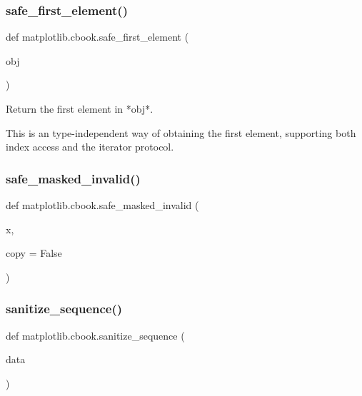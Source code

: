 \subsubsection{\texorpdfstring{safe\+\_\+first\+\_\+element()}{safe\_first\_element()}}
{\footnotesize\ttfamily def matplotlib.\+cbook.\+safe\+\_\+first\+\_\+element (\begin{DoxyParamCaption}\item[{}]{obj }\end{DoxyParamCaption})}

\begin{DoxyVerb}Return the first element in *obj*.

This is an type-independent way of obtaining the first element, supporting
both index access and the iterator protocol.
\end{DoxyVerb}
 \mbox{\label{namespacematplotlib_1_1cbook_a1b513669a33f2fff0c61d719ea76f0a1}} 
\subsubsection{\texorpdfstring{safe\+\_\+masked\+\_\+invalid()}{safe\_masked\_invalid()}}
{\footnotesize\ttfamily def matplotlib.\+cbook.\+safe\+\_\+masked\+\_\+invalid (\begin{DoxyParamCaption}\item[{}]{x,  }\item[{}]{copy = {\ttfamily False} }\end{DoxyParamCaption})}

\mbox{\label{namespacematplotlib_1_1cbook_a49db6f38fc64b1429d004a19c44d5582}} 
\subsubsection{\texorpdfstring{sanitize\+\_\+sequence()}{sanitize\_sequence()}}
{\footnotesize\ttfamily def matplotlib.\+cbook.\+sanitize\+\_\+sequence (\begin{DoxyParamCaption}\item[{}]{data }\end{DoxyParamCaption})}

